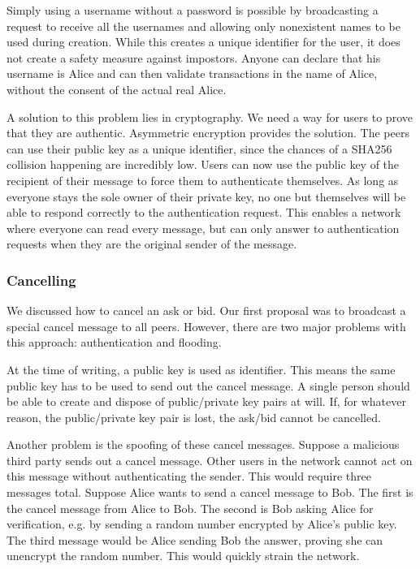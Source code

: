 \documentclass[]{article}
\begin{document}
Simply using a username without a password is possible by broadcasting a request to receive all the usernames and allowing only nonexistent names to be used during creation.
While this creates a unique identifier for the user, it does not create a safety measure against impostors.
Anyone can declare that his username is Alice and can then validate transactions in the name of Alice, without the consent of the actual real Alice.

A solution to this problem lies in cryptography.
We need a way for users to prove that they are authentic.
Asymmetric encryption provides the solution.
The peers can use their public key as a unique identifier, since the chances of a SHA256 collision happening are incredibly low.
Users can now use the public key of the recipient of their message to force them to authenticate themselves.
As long as everyone stays the sole owner of their private key, no one but themselves will be able to respond correctly to the authentication request.
This enables a network where everyone can read every message, but can only answer to authentication requests when they are the original sender of the message.


\subsubsection{Cancelling}
\label{sprint1:cancelling}
We discussed how to cancel an ask or bid.
Our first proposal was to broadcast a special cancel message to all peers.
However, there are two major problems with this approach: authentication and flooding.


At the time of writing, a public key is used as identifier.
This means the same public key has to be used to send out the cancel message.
A single person should be able to create and dispose of public/private key pairs at will.
If, for whatever reason, the public/private key pair is lost, the ask/bid cannot be cancelled.


Another problem is the spoofing of these cancel messages.
Suppose a malicious third party sends out a cancel message.
Other users in the network cannot act on this message without authenticating the sender.
This would require three messages total.
Suppose Alice wants to send a cancel message to Bob.
The first is the cancel message from Alice to Bob.
The second is Bob asking Alice for verification, e.g.
by sending a random number encrypted by Alice's public key.
The third message would be Alice sending Bob the answer, proving she can unencrypt the random number.
This would quickly strain the network.
\end{document}
